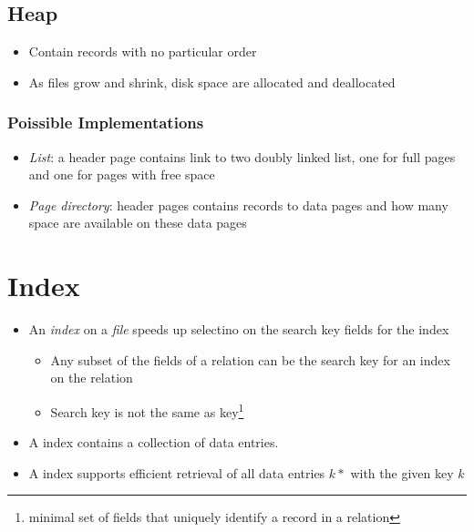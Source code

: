   \subsection{Heap}

    \begin{itemize}
      \item Contain records with no particular order
      \item As files grow and shrink, disk space are allocated and deallocated
    \end{itemize}

    \subsubsection{Poissible Implementations}

      \begin{itemize}
        \item \emph{List}: a header page contains link to two doubly linked list,
        one for full pages and one for pages with free space
        \item \emph{Page directory}: header pages contains records to data pages
        and how many space are available on these data pages
      \end{itemize}

\section{Index}

  \begin{itemize}
    \item An \emph{index} on a \emph{file} speeds up selectino on the search key fields
    for the index
    \begin{itemize}
      \item Any subset of the fields of a relation can be the search key for
      an index on the relation
      \item Search key is not the same as key\footnote{minimal set of
      fields that uniquely identify a record in a relation}
    \end{itemize}

    \item A index contains a collection of data entries.
    \item A index supports efficient retrieval of all data entries $ k* $
    with the given key $ k $
  \end{itemize}

